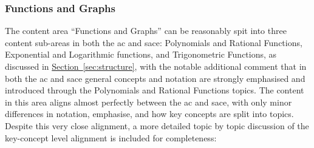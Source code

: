 \documentclass[twoside,12pt,a4paper]{report}
\newcommand{\refsec}[1]{\hyperref[sec:#1]{Section~\ref{sec:#1}}}
\begin{document}
\subsubsection{Functions and Graphs}

The content area ``Functions and Graphs'' can be reasonably spit into three content sub-areas in both the \gls{ac} and \gls{sace}: Polynomials and Rational Functions, Exponential and Logarithmic functions, and Trigonometric Functions, as discussed in \refsec{structure}, with the notable additional comment that in both the \gls{ac} and \gls{sace} general concepts and notation are strongly emphasised and introduced through the Polynomials and Rational Functions topics. The content in this area aligns almost perfectly between the \gls{ac} and \gls{sace}, with only minor differences in notation, emphasise, and how key concepts are split into topics. Despite this very close alignment, a more detailed topic by topic discussion of the key-concept level alignment is included for completeness:
\end{document}
